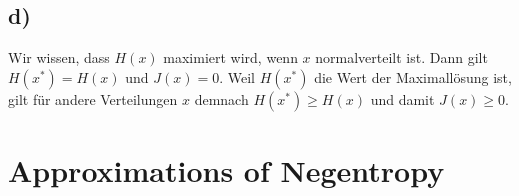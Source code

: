 \documentclass[paper=a4,fontsize=10pt,DIV11,BCOR10mm]{scrartcl}
\begin{document}
\subsection*{d)}

Wir wissen, dass $H(x)$ maximiert wird, wenn $x$ normalverteilt ist. Dann gilt $H(x^*) = H(x)$ und $J(x) = 0$. Weil $H(x^*)$ die Wert der Maximallösung ist, gilt für andere Verteilungen $x$ demnach $H(x^*) \geq H(x)$ und damit $J(x) \geq 0$.




\section{Approximations of Negentropy}



\end{document}
